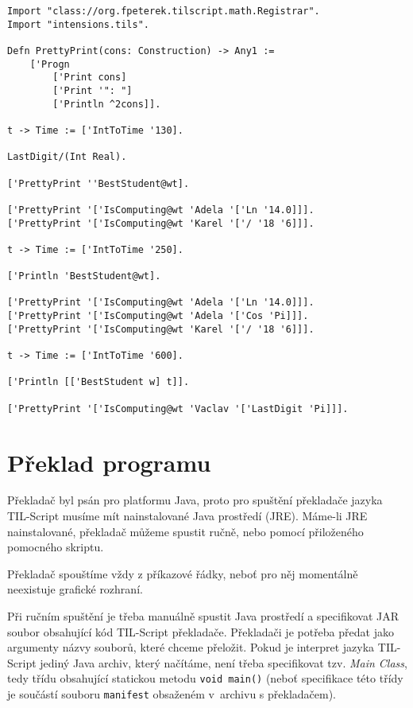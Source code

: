 \begin{lstlisting}[caption={Funkce a uzávěry}, language=Tilscript]
Import "class://org.fpeterek.tilscript.math.Registrar".
Import "intensions.tils".

Defn PrettyPrint(cons: Construction) -> Any1 :=
    ['Progn
        ['Print cons]
        ['Print '": "]
        ['Println ^2cons]].

t -> Time := ['IntToTime '130].

LastDigit/(Int Real).

['PrettyPrint ''BestStudent@wt].

['PrettyPrint '['IsComputing@wt 'Adela '['Ln '14.0]]].
['PrettyPrint '['IsComputing@wt 'Karel '['/ '18 '6]]].

t -> Time := ['IntToTime '250].

['Println 'BestStudent@wt].

['PrettyPrint '['IsComputing@wt 'Adela '['Ln '14.0]]].
['PrettyPrint '['IsComputing@wt 'Adela '['Cos 'Pi]]].
['PrettyPrint '['IsComputing@wt 'Karel '['/ '18 '6]]].

t -> Time := ['IntToTime '600].

['Println [['BestStudent w] t]].

['PrettyPrint '['IsComputing@wt 'Vaclav '['LastDigit 'Pi]]].
\end{lstlisting}

\section{Překlad programu}

Překladač byl psán pro platformu Java, proto pro spuštění překladače jazyka TIL-Script musíme mít
nainstalované Java prostředí (JRE). Máme-li JRE nainstalované, překladač můžeme spustit ručně, nebo
pomocí přiloženého pomocného skriptu.

Překladač spouštíme vždy z příkazové řádky, neboť pro něj momentálně neexistuje grafické rozhraní.

Při ručním spuštění je třeba manuálně spustit Java prostředí a specifikovat JAR soubor obsahující
kód TIL-Script překladače. Překladači je potřeba předat jako argumenty názvy souborů, které chceme
přeložit. Pokud je interpret jazyka TIL-Script jediný Java archiv, který načítáme, není třeba
specifikovat tzv. \textit{Main Class}, tedy třídu obsahující statickou metodu
\lstinline{void main()} (neboť specifikace této třídy je součástí souboru \lstinline{manifest}
obsaženém v~archivu s překladačem).

